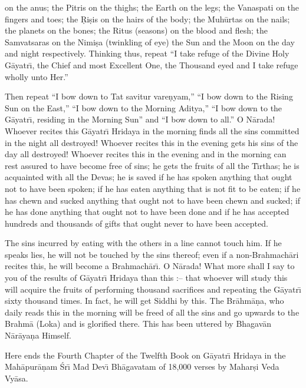 on the anus; the Pitris on the thighs; the Earth on the legs; the Vanaspati on the fingers and toes; the \d{R}i\d{s}is on the hairs of the body; the Muh\=urtas on the nails; the planets on the bones; the Ritus (seasons) on the blood and flesh; the Samvatsaras on the Nimi\d{s}a (twinkling of eye) the Sun and the Moon on the day and night respectively. Thinking thus, repeat ``I take refuge of the Divine Holy G\=ayatr\={\i}, the Chief and most Excellent One, the Thousand eyed and I take refuge wholly unto Her.''

Then repeat ``I bow down to Tat savitur vare\d{n}yam,'' ``I bow down to the Rising Sun on the East,'' ``I bow down to the Morning Aditya,'' ``I bow down to the G\=ayatr\={\i}, residing in the Morning Sun'' and ``I bow down to all.'' O N\=arada! Whoever recites this G\=ayatr\={\i} Hridaya in the morning finds all the sins committed in the night all destroyed! Whoever recites this in the evening gets his sins of the day all destroyed! Whoever recites this in the evening and in the morning can rest assured to have become free of sins; he gets the fruits of all the T\={\i}rthas; he is acquainted with all the Devas; he is saved if he has spoken anything that ought not to have been spoken; if he has eaten anything that is not fit to be eaten; if he has chewn and sucked anything that ought not to have been chewn and sucked; if he has done anything that ought not to have been done and if he has accepted hundreds and thousands of gifts that ought never to have been accepted.

The sins incurred by eating with the others in a line cannot touch him. If he speaks lies, he will not be touched by the sins thereof; even if a non-Brahmach\=ari recites this, he will become a Brahmach\=ar\={\i}. O N\=arada! What more shall I say to you of the results of G\=ayatr\={\i} Hridaya than this :-- that whoever will study this will acquire the fruits of performing thousand sacrifices and repeating the G\=ayatr\={\i} sixty thousand times. In fact, he will get Siddhi by this. The Br\=ahm\=a\d{n}a, who daily reads this in the morning will be freed of all the sins and go upwards to the Brahm\=a (Loka) and is glorified there. This has been uttered by Bhagav\=an N\=ar\=aya\d{n}a Himself.

Here ends the Fourth Chapter of the Twelfth Book on G\=ayatr\={\i} Hridaya in the Mah\=apur\=a\d{n}am \'Sr\={\i} Mad Dev\={\i} Bh\=agavatam of 18,000 verses by Mahar\d{s}i Veda Vy\=asa.



